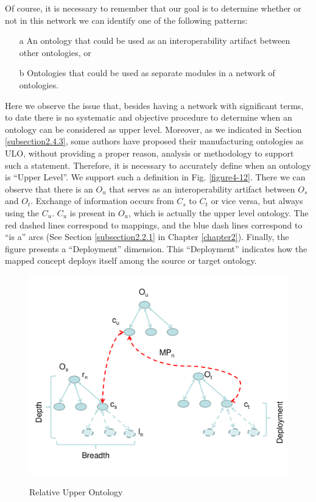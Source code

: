 Of course, it is necessary to remember that our goal is to determine whether or not in this network we can identify one of the following patterns:

\begin{itemize}
	\item[a] An ontology that could be used as an interoperability artifact between other ontologies, or
	\item[b] Ontologies that could be used as separate modules in a network of ontologies. 
\end{itemize}


Here we observe the issue that, besides having a network with significant terms, to date there is no systematic and objective procedure to determine   when an ontology can be   considered as upper level. Moreover, as we indicated in Section \ref{subsection2.4.3}, some authors have proposed their manufacturing ontologies as ULO, without providing a proper reason, analysis or methodology to support such a statement. Therefore, it is necessary to accurately define when an ontology is “Upper Level”. We support such a definition in Fig. \ref{figure4-12}. There we can observe that there is an $O_{u}$ that serves as an interoperability artifact between $O_{s}$ and $O_{t}$. Exchange of information occurs from $C_{s}$ to $C_{t}$ or vice versa, but always using the $C_{u}$. $C_{u}$ is present in $O_{u}$, which is actually the  upper level ontology. The red dashed lines correspond to mappings, and the blue dash lines correspond to “is a” arcs (See Section \ref{subsection2.2.1} in Chapter \ref{chapter2}). Finally, the figure presents a “Deployment” dimension. This “Deployment” indicates how the mapped concept deploys itself among the source or target ontology. 



\begin{figure}
	\begin{center}
		\includegraphics[scale=0.6, angle=90]{figure-chapterIV/fig4-11.pdf}\\
		\caption{Relative Upper Ontology}
		\label{figure4-11}
	\end{center}
\end{figure}



